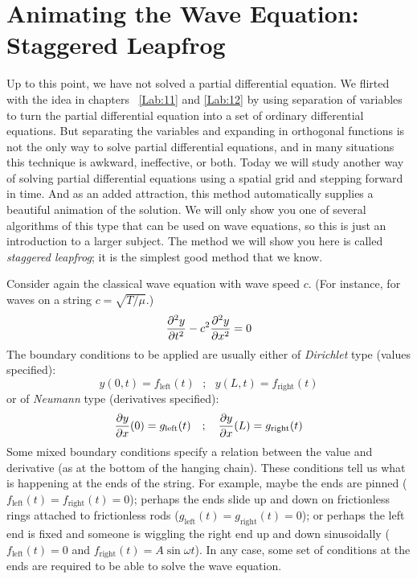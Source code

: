 \chapter{Animating the Wave Equation: Staggered Leapfrog}
\label{Lab:13}

Up to this point, we have not solved a partial differential equation.
We flirted with the idea in  chapters ~\ref{Lab:11} and \ref{Lab:12}
by using separation of variables to turn the partial differential equation into a set
of ordinary differential equations. But separating the
variables and expanding in orthogonal functions is not the only
way to solve partial differential equations, and in
many situations this technique is awkward, ineffective, or
both. Today we will study another way of solving partial
differential equations using a spatial grid and stepping
forward in time. And as an added attraction, this method
automatically supplies a beautiful animation of the solution.
We will only show you one of several algorithms of this type
that can be used on wave equations, so this is just an
introduction to a larger subject.   The method we will show you here is called {\it
staggered leapfrog}; it is the simplest good method that we
know.


Consider again the classical wave equation with wave speed $c$.
(For instance, for waves on a string $c=\sqrt{T/ \mu}$.)
\begin{equation}
    {\partial^2 y \over \partial t^2} - c^2 {\partial^2 y \over \partial x^2} = 0
\end{equation}
The boundary conditions to be applied are usually either of {\it
Dirichlet} type (values specified):
\begin{equation}
    y(0,t)=f_\mathrm{left}(t)~~~;~~~y(L,t)=f_\mathrm{right}(t)
\end{equation}
or of {\it Neumann} type (derivatives specified):
\begin{equation}
    {\partial y \over \partial x}(0)=g_\mathrm{left}(t)~~~;~~~
    {\partial y \over \partial x}(L)=g_\mathrm{right}(t)
\end{equation}
Some mixed boundary conditions specify a relation between the value
and derivative (as at the bottom of the hanging chain). These
conditions tell us what is happening at the ends of the string. For
example, maybe the ends are pinned
($f_\mathrm{left}(t)=f_\mathrm{right}(t)=0$); perhaps the ends slide
up and down on frictionless rings attached to frictionless rods
($g_\mathrm{left}(t)=g_\mathrm{right}(t)=0$); or perhaps the left end
is fixed and someone is wiggling the right end up and down
sinusoidally ($f_\mathrm{left}(t)=0$ and $f_\mathrm{right}(t)=A
\sin{\omega t}$). In any case, some set of conditions at the ends are
required to be able to solve the wave equation.


